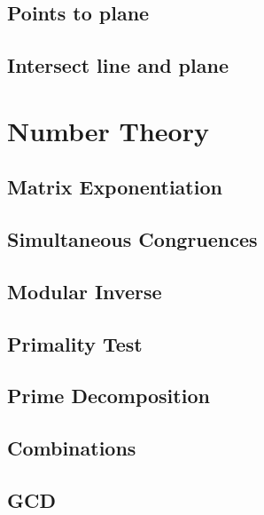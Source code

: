 \documentclass{article}
\begin{document}
	\subsection{Points to plane}
	

	\subsection{Intersect line and plane}
	

\section{Number Theory}
	\subsection{Matrix Exponentiation}
	

	\newpage
	\subsection{Simultaneous Congruences}
	
	
	\subsection{Modular Inverse}
	

	\subsection{Primality Test}
	

	\newpage
	\subsection{Prime Decomposition}
	

	\subsection{Combinations}
	
	
	\subsection{GCD}
	

%

%
\end{document}
